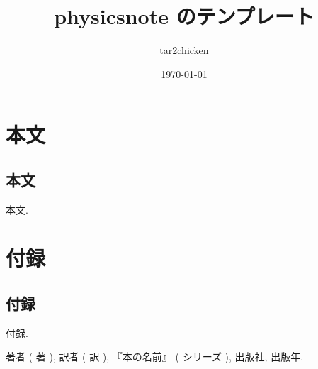 \documentclass[dvipdfmx]{jsarticle}
\title{physicsnote のテンプレート}
\author{tar2chicken}
\date{\today}
\begin{document}
\maketitle
\tableofcontents
\section{本文}
	\subsection{本文}
		本文.


\section{付録}
	\subsection{付録}
		付録.
		\begin{thebibliography}{9}
			 著者 ( 著 ), 訳者 ( 訳 ), 『本の名前』 ( シリーズ ), 出版社, 出版年.
		\end{thebibliography}
\end{document}

